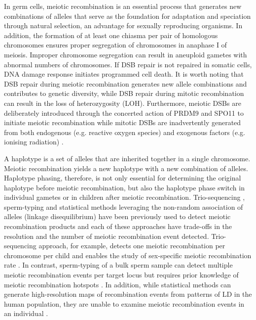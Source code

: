 In germ cells, meiotic recombination is an essential process that generates new combinations of alleles that serve as the foundation for adaptation and speciation through natural selection, an advantage for sexually reproducing organisms. In addition, the formation of at least one chiasma per pair of homologous chromosomes ensures proper segregation of chromosomes in anaphase I of meiosis. Improper chromosome segregation can result in aneuploid gametes with abnormal numbers of chromosomes. If DSB repair is not repaired in somatic cells, DNA damage response initiates programmed cell death. It is worth noting that DSB repair during meiotic recombination generates new allele combinations and contributes to genetic diversity, while DSB repair during mitotic recombination can result in the loss of heterozygosity (LOH). Furthermore, meiotic DSBs are deliberately introduced through the concerted action of PRDM9 and SPO11 to initiate meiotic recombination \cite{} while mitotic DSBs are inadvertently generated from both endogenous (e.g. reactive oxygen species) and exogenous factors (e.g. ionising radiation) \cite{}. 

A haplotype is a set of alleles that are inherited together in a single chromosome. Meiotic recombination yields a new haplotype with a new combination of alleles. Haplotype phasing, therefore, is not only essential for determining the original haplotype before meiotic recombination, but also the haplotype phase switch in individual gametes or in children after meiotic recombination. Trio-sequencing \cite{}, sperm-typing \cite{} and statistical methods leveraging the non-random association of alleles (linkage disequilibrium) \cite{} have been previously used to detect meiotic recombination products and each of these approaches have trade-offs in the resolution and the number of meiotic recombination event detected. Trio-sequencing approach, for example, detects one meiotic recombination per chromosome per child and enables the study of sex-specific meiotic recombination rate \cite{}. In contrast, sperm-typing of a bulk sperm sample can detect multiple meiotic recombination events per target locus but requires prior knowledge of meiotic recombination hotspots \cite{}. In addition, while statistical methods can generate high-resolution maps of recombination events from patterns of LD in the human population, they are unable to examine meiotic recombination events in an individual \cite{}.

